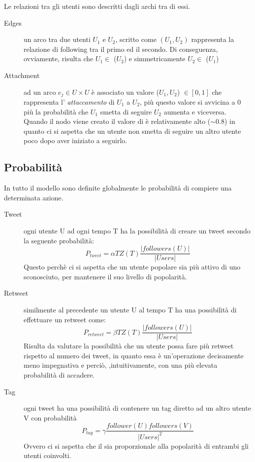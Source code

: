 Le relazioni tra gli utenti sono descritti dagli archi tra di essi.
\begin{description}
  \item[Edges] un arco tra due utenti $U_1$ e $U_2$, scritto come
  $(U_1 ,U_2)$ rappresenta la relazione di following tra il primo 
  ed il secondo. Di conseguenza, ovviamente, 
  risulta che $U_1 \in $  \followers{}($U_2$) e simmetricamente
   $U_2 \in $  \following{}($U_1$)
   \item[Attachment] ad un arco $e_j \in U\times U$ \`e associato un 
   valore \attach{}($U_1, U_2$) $ \in [0,1]$ che rappresenta l' 
   \textit{attaccamento} di $U_1$ a $U_2$, pi\`u questo valore si 
   avvicina a 0 pi\`u la probabilit\`a che $U_1$ smetta di seguire
   $U_2$ aumenta e viceversa. Quando il nodo viene creato il valore
   di \attach{} \`e relativamente alto ($\sim 0.8$) in quanto ci si 
   aspetta che un utente non smetta di seguire un altro utente
   poco dopo aver iniziato a seguirlo.
\end{description}

\subsection{Probabilit\`a}
\label{subsec:prob}

In tutto il modello sono definite globalmente le 
probabilit\`a di compiere una determinata azione.

\begin{description}
  \item[Tweet] ogni utente U ad ogni tempo T ha la possibilit\`a
  di creare un tweet secondo la seguente probabilit\`a:
    \begin{equation}
    \label{eq:ptwt}
      P_{tweet} = \alpha TZ(T) \dfrac{|followers(U)|}{|Users|}
    \end{equation}
  Questo perch\`e ci si aspetta che un utente popolare sia pi\`u 
  attivo di uno sconosciuto, per mantenere il suo livello di 
  popolarit\`a.
  
  \item[Retweet] similmente al precedente un utente U al tempo T
  ha una possibilit\`a di effettuare un retweet come:
    \begin{equation}
    \label{eq:pretwt}
        P_{retweet} = \beta TZ(T) \dfrac{|followers(U)|}{|Users|}
    \end{equation}
    Risulta da valutare la possibilit\`a che un utente possa fare 
    pi\`u  retweet rispetto al numero dei tweet, in quanto essa \`e
    un'operazione decisamente meno impegnativa e perci\`o,
    ,intuitivamente,
    con una pi\`u elevata probabilit\`a di accadere.
    
  \item[Tag] ogni tweet ha una possibilit\`a di contenere un tag 
  diretto ad un altro utente V con probabilit\`a
  \begin{equation}
  \label{eq:ptag}
    P_{tag} = \gamma \dfrac{follower(U) followers(V)}{{|Users|^2}}
  \end{equation} 
  Ovvero ci si aspetta che il \dtag{} sia proporzionale alla 
  popolarit\`a di entrambi gli utenti coinvolti.
\end{description}

